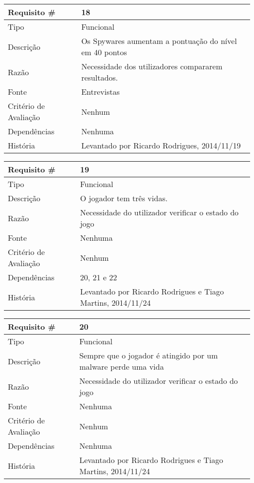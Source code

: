 \begin{tabular} {|l|p{8cm}|} 
\hline
Requisito \# & 18 \\
\hline
Tipo & Funcional \\
\hline
Descrição & Os Spywares aumentam a pontuação do nível em 40 pontos \\
\hline
Razão & Necessidade dos utilizadores compararem resultados. \\
\hline
Fonte & Entrevistas \\
\hline
Critério de Avaliação & Nenhum \\
\hline
Dependências & Nenhuma \\
\hline
História & Levantado por Ricardo Rodrigues, 2014/11/19 \\
\hline
\end{tabular}

\begin{tabular} {|l|p{8cm}|} 
\hline
Requisito \# & 19 \\
\hline
Tipo & Funcional \\
\hline
Descrição & O jogador tem três vidas. \\
\hline
Razão & Necessidade do utilizador verificar o estado do jogo \\
\hline
Fonte & Nenhuma \\
\hline
Critério de Avaliação & Nenhum \\
\hline
Dependências & 20, 21 e 22 \\
\hline
História & Levantado por Ricardo Rodrigues e Tiago Martins, 2014/11/24 \\
\hline
\end{tabular}

\begin{tabular} {|l|p{8cm}|} 
\hline
Requisito \# & 20 \\
\hline
Tipo & Funcional \\
\hline
Descrição & Sempre que o jogador é atingido por um malware perde uma vida \\
\hline
Razão & Necessidade do utilizador verificar o estado do jogo \\
\hline
Fonte & Nenhuma \\
\hline
Critério de Avaliação & Nenhum \\
\hline
Dependências & Nenhuma \\
\hline
História & Levantado por Ricardo Rodrigues e Tiago Martins, 2014/11/24 \\
\hline
\end{tabular}

